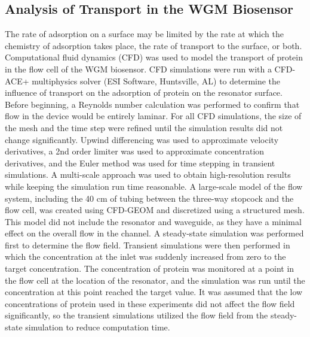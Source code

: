 \subsection{Analysis of Transport in the WGM Biosensor}

The rate of adsorption on a surface may be limited by the rate at
which the chemistry of adsorption takes place, the rate of transport
to the surface, or both. Computational fluid dynamics (CFD) was used
to model the transport of protein in the flow cell of the WGM biosensor.
CFD simulations were run with a CFD-ACE+ multiphysics solver (ESI
Software, Huntsville, AL) to determine the influence of transport
on the adsorption of protein on the resonator surface. Before beginning,
a Reynolds number calculation was performed to confirm that flow in
the device would be entirely laminar. For all CFD simulations, the
size of the mesh and the time step were refined until the simulation
results did not change significantly. Upwind differencing was used
to approximate velocity derivatives, a 2nd order limiter was used
to approximate concentration derivatives, and the Euler method was
used for time stepping in transient simulations. A multi-scale approach
was used to obtain high-resolution results while keeping the simulation
run time reasonable. A large-scale model of the flow system, including
the 40 cm of tubing between the three-way stopcock and the flow cell,
was created using CFD-GEOM and discretized using a structured mesh.
This model did not include the resonator and waveguide, as they have
a minimal effect on the overall flow in the channel. A steady-state
simulation was performed first to determine the flow field. Transient
simulations were then performed in which the concentration at the
inlet was suddenly increased from zero to the target concentration.
The concentration of protein was monitored at a point in the flow
cell at the location of the resonator, and the simulation was run
until the concentration at this point reached the target value. It
was assumed that the low concentrations of protein used in these experiments
did not affect the flow field significantly, so the transient simulations
utilized the flow field from the steady-state simulation to reduce
computation time. 

